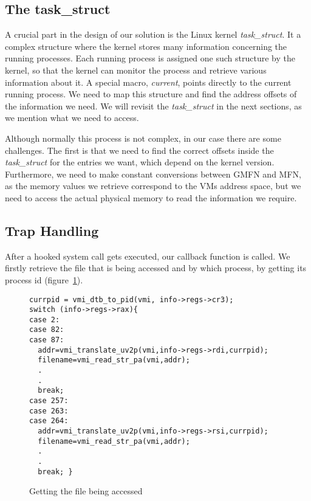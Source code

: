 \subsection{The task\_struct}\label{sub:struct}
A crucial part in the design of our solution is the Linux kernel \textit{task\_struct}. It a complex structure where the kernel stores many information concerning the running processes. Each running process is assigned one such structure by the kernel, so that the kernel can monitor the process and retrieve various information about it. A special macro, \textit{current}, points directly to the current running process. We need to map this structure and find the address offsets of the information we need. We will revisit the \textit{task\_struct} in the next sections, as we mention what we need to access.
\par Although normally this process is not complex, in our case there are some challenges. The first is that we need to find the correct offsets inside the \textit{task\_struct} for the entries we want, which depend on the kernel version. Furthermore, we need to make constant conversions between \ac{GMFN} and \ac{MFN}, as the memory values we retrieve correspond to the \ac{VM}s address space, but we need to access the actual physical memory to read the information we require.

\subsection{Trap Handling}\label{sub:handling}

After a hooked system call gets executed, our callback function is called. We firstly retrieve the file that is being accessed and by which process, by getting its process id (figure~\ref{fig:getfile}). 

\begin{figure}[ht]
\centering
\begin{lstlisting}
currpid = vmi_dtb_to_pid(vmi, info->regs->cr3);
switch (info->regs->rax){
case 2:
case 82:
case 87:
  addr=vmi_translate_uv2p(vmi,info->regs->rdi,currpid);
  filename=vmi_read_str_pa(vmi,addr);
  .
  .
  break;
case 257:
case 263:
case 264:
  addr=vmi_translate_uv2p(vmi,info->regs->rsi,currpid);
  filename=vmi_read_str_pa(vmi,addr);
  .
  .
  break; }
\end{lstlisting}
\caption{Getting the file being accessed}
\label{fig:getfile}
\end{figure}


